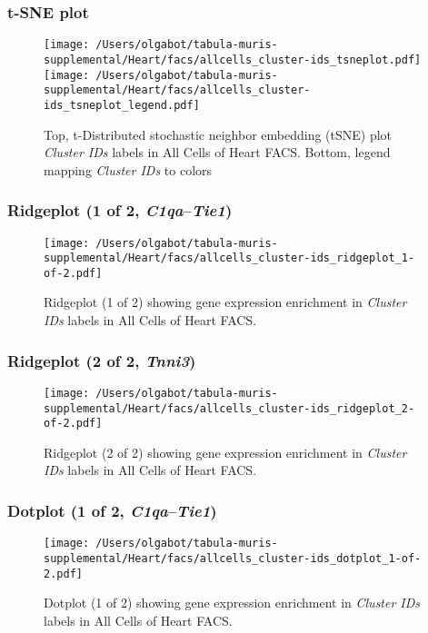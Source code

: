 \clearpage
\subsubsection{t-SNE plot}
\begin{figure}[h]
\centering
\texttt{[image: /Users/olgabot/tabula-muris-supplemental/Heart/facs/allcells\_cluster-ids\_tsneplot.pdf]}
\texttt{[image: /Users/olgabot/tabula-muris-supplemental/Heart/facs/allcells\_cluster-ids\_tsneplot\_legend.pdf]}
\caption{Top, t-Distributed stochastic neighbor embedding (tSNE) plot  \emph{Cluster IDs} labels in All Cells of Heart FACS. Bottom, legend mapping \emph{Cluster IDs} to colors}
\end{figure}


\clearpage

\subsubsection{Ridgeplot (1 of 2, \emph{C1qa}--\emph{Tie1})}
\begin{figure}[h]
\centering
\texttt{[image: /Users/olgabot/tabula-muris-supplemental/Heart/facs/allcells\_cluster-ids\_ridgeplot\_1-of-2.pdf]}

\caption{ Ridgeplot (1 of 2)  showing gene expression enrichment in \emph{Cluster IDs} labels in All Cells of Heart FACS. }
\end{figure}


\clearpage

\subsubsection{Ridgeplot (2 of 2, \emph{Tnni3})}
\begin{figure}[h]
\centering
\texttt{[image: /Users/olgabot/tabula-muris-supplemental/Heart/facs/allcells\_cluster-ids\_ridgeplot\_2-of-2.pdf]}

\caption{ Ridgeplot (2 of 2)  showing gene expression enrichment in \emph{Cluster IDs} labels in All Cells of Heart FACS. }
\end{figure}


\clearpage

\subsubsection{Dotplot (1 of 2, \emph{C1qa}--\emph{Tie1})}
\begin{figure}[h]
\centering
\texttt{[image: /Users/olgabot/tabula-muris-supplemental/Heart/facs/allcells\_cluster-ids\_dotplot\_1-of-2.pdf]}

\caption{ Dotplot (1 of 2)  showing gene expression enrichment in \emph{Cluster IDs} labels in All Cells of Heart FACS. }
\end{figure}


